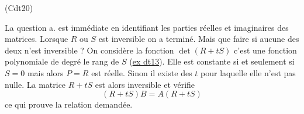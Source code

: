 \begin{tiny}(Cdt20)\end{tiny} La question a. est immédiate en identifiant les parties réelles et imaginaires des matrices. Lorsque $R$ ou $S$ est inversible on a terminé. Mais que faire si aucune des deux n'est inversible ?\newline
On considère la fonction $\det(R+tS)$ c'est une fonction polynomiale de degré le rang de $S$ (\href{\exosurl Wdt13.html}{ex dt13}). Elle est constante si et seulement si $S=0$ mais alors $P=R$ est réelle. Sinon il existe des $t$ pour laquelle elle n'est pas nulle. La matrice $R+tS$ est alors inversible et vérifie
\begin{displaymath}
 (R+tS)B = A (R+tS)
\end{displaymath}
 ce qui prouve la relation demandée.